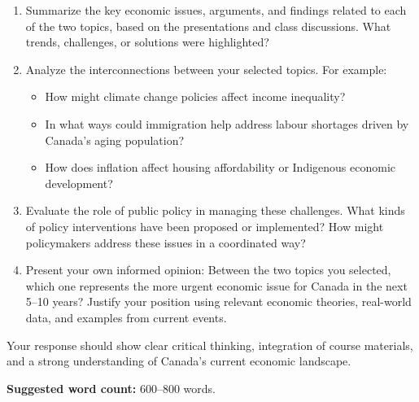 \documentclass[12pt]{article}
\begin{document}
\begin{enumerate}
\item Summarize the key economic issues, arguments, and findings related to each of the two topics, based on the presentations and class discussions. What trends, challenges, or solutions were highlighted?

\item Analyze the interconnections between your selected topics. For example:
\begin{itemize}
\item How might climate change policies affect income inequality?
\item In what ways could immigration help address labour shortages driven by Canada’s aging population?
\item How does inflation affect housing affordability or Indigenous economic development?
\end{itemize}

\item Evaluate the role of public policy in managing these challenges. What kinds of policy interventions have been proposed or implemented? How might policymakers address these issues in a coordinated way?

\item Present your own informed opinion: Between the two topics you selected, which one represents the more urgent economic issue for Canada in the next 5--10 years? Justify your position using relevant economic theories, real-world data, and examples from current events.
\end{enumerate}

\bigskip

Your response should show clear critical thinking, integration of course materials, and a strong understanding of Canada’s current economic landscape.

\bigskip

\noindent
\textbf{Suggested word count:} 600--800 words.
\end{document}
